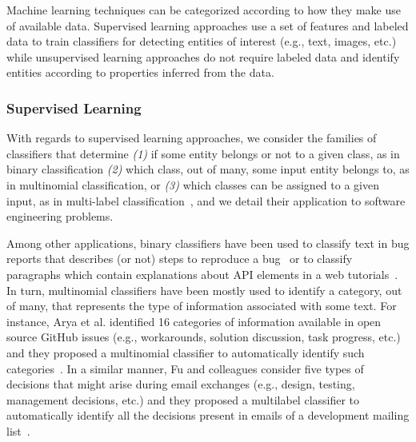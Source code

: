 Machine learning techniques can be categorized 
according to how they make use of available data. 
Supervised learning approaches use a set of features and labeled data
to train classifiers for detecting entities of interest (e.g., text, images, etc.)
while unsupervised learning approaches do not require labeled data and 
identify entities according to properties inferred from the data.



\subsubsection{Supervised Learning }
\label{cp2:supervised}


With regards to supervised learning approaches, 
we consider the families of classifiers that 
determine
\textit{(1)} if some entity belongs or not to a given class, as in binary classification
\textit{(2)} which class, out of many, some input entity belongs to, as in multinomial classification, or
\textit{(3)} which classes can be assigned to a given input, as in multi-label classification~\cite{alpaydin2020ml},
 and we detail their application to software engineering problems.






Among other applications, binary classifiers have been used 
to classify text in bug reports that describes (or not) steps to reproduce a bug~\cite{Chaparro2016}
or  to classify paragraphs which contain explanations 
about API elements in a web tutorials~\cite{Petrosyan2015}.
In turn, multinomial classifiers have been mostly used 
to identify a category, out of many, that represents the type of information 
associated with some text. For instance, Arya et al. identified 16 categories of  information available
in open source GitHub issues (e.g., workarounds, solution discussion, task progress, etc.)
and they proposed a multinomial classifier 
to automatically identify such categories~\cite{Arya2019}.
In a similar manner, Fu and colleagues consider 
five types of decisions that might arise during 
email exchanges (e.g., design, testing, management decisions, etc.)
and they proposed a multilabel classifier 
to automatically identify all the decisions present in emails of
a development mailing list~\cite{fu2021}.





